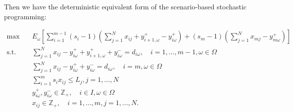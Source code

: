 









Then we have the deterministic equivalent form of the scenario-based stochastic programming:

\begin{equation}\label{sto_form}
    \begin{aligned}
    \max \quad & E_{\omega}\left[\sum_{i=1}^{m-1} (s_i-1) (\sum_{j= 1}^{N} x_{ij} + y_{i+1,\omega}^{+} - y_{i \omega}^{+}) + (s_m-1) (\sum_{j= 1}^{N} x_{mj} - y_{m \omega}^{+})\right] \\
    \text {s.t.} \quad & \sum_{j= 1}^{N} x_{ij}-y_{i \omega}^{+}+
    y_{i+1, \omega}^{+} + y_{i \omega}^{-}=d_{i \omega}, \quad i =1,\ldots,m-1, \omega \in \Omega \\
    & \sum_{j= 1}^{N} x_{ij} -y_{i \omega}^{+}+y_{i \omega}^{-}=d_{i \omega}, \quad i = m, \omega \in \Omega \\
    & \sum_{i=1}^{m} s_{i} x_{ij} \leq L_j, j =1,\ldots, N\\
    & y_{i \omega}^{+}, y_{i \omega}^{-} \in \mathbb{Z}_{+}, \quad i \in I, \omega \in \Omega \\
    & x_{ij} \in \mathbb{Z}_{+}, \quad i=1,\ldots,m, j =1,\ldots,N.
    \end{aligned}
  \end{equation}


